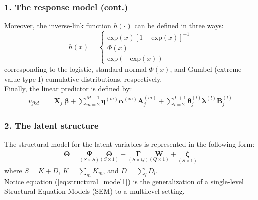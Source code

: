\documentclass[nonav,sleutel]{beamer}
\begin{document}
	\begin{frame}
		\frametitle{1. The response model (cont.)}
		Moreover, the inverse-link function $h(\cdot)$ can be defined in three ways:
		\begin{equation} \label{eq:response_dich1}
			h(x) = 
			\begin{cases}
				\text{exp}(x)[1 + \text{exp}(x)]^{-1} \\
				\Phi(x)  \\
				\text{exp}(-\text{exp}(x))
			\end{cases}
		\end{equation}
		\noindent corresponding to the logistic, standard normal $\Phi(x)$, and Gumbel (extreme value type I) cumulative distributions, respectively. \\
		\vspace{0.3cm} Finally, the linear predictor is defined by:
		\begin{equation} \label{eq:linear_predictor2}
			\begin{split}
				v_{jkd} &= \mathbf{X}_{j} \; \pmb{\beta} + \sum_{m=2}^{M+1} \pmb{\eta}^{(m)} \pmb{\alpha}^{(m)} \mathbf{A}_{j}^{(m)} + \sum_{l=2}^{L+1} \pmb{\theta}_{j}^{(l)} \pmb{\lambda}^{(l)} \mathbf{B}_{j}^{(l)}
			\end{split}
		\end{equation}
	\end{frame}
	\begin{frame}
		\frametitle{2. The latent structure}
		The structural model for the latent variables is represented in the following form:
		\begin{equation} \label{eq:structural_model1}
			\begin{split}
				\pmb{\Theta} = \underset{(S \times S)}{\pmb{\Psi}} \underset{(S \times 1)}{\pmb{\Theta}} + \underset{(S \times Q)}{\pmb{\Gamma}} \underset{(Q \times 1)}{\mathbf{W}} + \underset{(S \times 1)}{\pmb{\zeta}}
			\end{split}
		\end{equation}
		where $S=K+D$, $K = \sum_{m} K_{m}$, and $D = \sum_{l} D_{l}$. \\
		\vspace{0.3cm} Notice equation (\ref{eq:structural_model1}) is the generalization of a single-level Structural Equation Models (SEM) to a multilevel setting.
	\end{frame}
\end{document}
